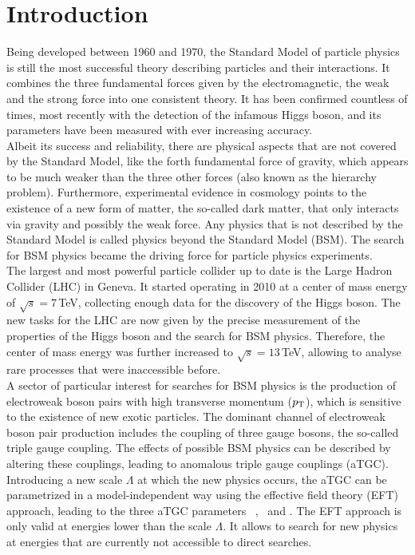 \chapter*{Introduction}
Being developed between 1960 and 1970, the Standard Model of particle physics is still the most successful theory describing particles and their interactions. It combines the three fundamental forces given by the electromagnetic, the weak and the strong force into one consistent theory. It has been confirmed countless of times, most recently with the detection of the infamous Higgs boson, and its parameters have been measured with ever increasing accuracy.\\

Albeit its success and reliability, there are physical aspects that are not covered by the Standard Model, like the forth fundamental force of gravity, which appears to be much weaker than the three other forces (also known as the hierarchy problem). Furthermore, experimental evidence in cosmology points to the existence of a new form of matter, the so-called dark matter, that only interacts via gravity and possibly the weak force. Any physics that is not described by the Standard Model is called physics beyond the Standard Model (BSM). The search for BSM physics became the driving force for particle physics experiments.\\

The largest and most powerful particle collider up to date is the Large Hadron Collider (LHC) in Geneva. It started operating in 2010 at a center of mass energy of $\sqrt{s}=7$\,TeV, collecting enough data for the discovery of the Higgs boson. The new tasks for the LHC are now given by the precise measurement of the properties of the Higgs boson and the search for BSM physics. Therefore, the center of mass energy was further increased to $\sqrt{s}=13$\,TeV, allowing to analyse rare processes that were inaccessible before.\\

A sector of particular interest for searches for BSM physics is the production of electroweak boson pairs with high transverse momentum ($p_{\rm T}$), which is sensitive to the existence of new exotic particles. The dominant channel of electroweak boson pair production includes the coupling of three gauge bosons, the so-called triple gauge coupling. The effects of possible BSM physics can be described by altering these couplings, leading to anomalous triple gauge couplings (aTGC). Introducing a new scale $\Lambda$ at which the new physics occurs, the aTGC can be parametrized in a model-independent way using the effective field theory (EFT) approach, leading to the three aTGC parameters \Tcwww \ , \Tccw \ and \Tcb . The EFT approach is only valid at energies lower than the scale $\Lambda$. It allows to search for new physics at energies that are currently not accessible to direct searches.\\

